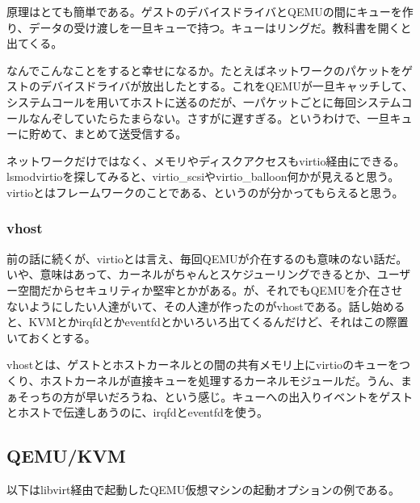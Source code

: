 \documentclass[9pt,b5paper,tombo]{jsbook}
\begin{document}
原理はとても簡単である。ゲストのデバイスドライバとQEMUの間にキューを作り、データの受け渡しを一旦キューで持つ。キューはリングだ。教科書を開くと出てくる。

なんでこんなことをすると幸せになるか。たとえばネットワークのパケットをゲストのデバイスドライバが放出したとする。これをQEMUが一旦キャッチして、システムコールを用いてホストに送るのだが、一パケットごとに毎回システムコールなんぞしていたらたまらない。さすがに遅すぎる。というわけで、一旦キューに貯めて、まとめて送受信する。

ネットワークだけではなく、メモリやディスクアクセスもvirtio経由にできる。lsmodvirtioを探してみると、virtio\_scsiやvirtio\_balloon何かが見えると思う。virtioとはフレームワークのことである、というのが分かってもらえると思う。

\subsubsection{vhost}

前の話に続くが、virtioとは言え、毎回QEMUが介在するのも意味のない話だ。いや、意味はあって、カーネルがちゃんとスケジューリングできるとか、ユーザー空間だからセキュリティか堅牢とかがある。が、それでもQEMUを介在させないようにしたい人達がいて、その人達が作ったのがvhostである。話し始めると、KVMとかirqfdとかeventfdとかいろいろ出てくるんだけど、それはこの際置いておくとする。

vhostとは、ゲストとホストカーネルとの間の共有メモリ上にvirtioのキューをつくり、ホストカーネルが直接キューを処理するカーネルモジュールだ。うん、まぁそっちの方が早いだろうね、という感じ。キューへの出入りイベントをゲストとホストで伝達しあうのに、irqfdとeventfdを使う。

\subsection{QEMU/KVM}

以下はlibvirt経由で起動したQEMU仮想マシンの起動オプションの例である。
\end{document}
